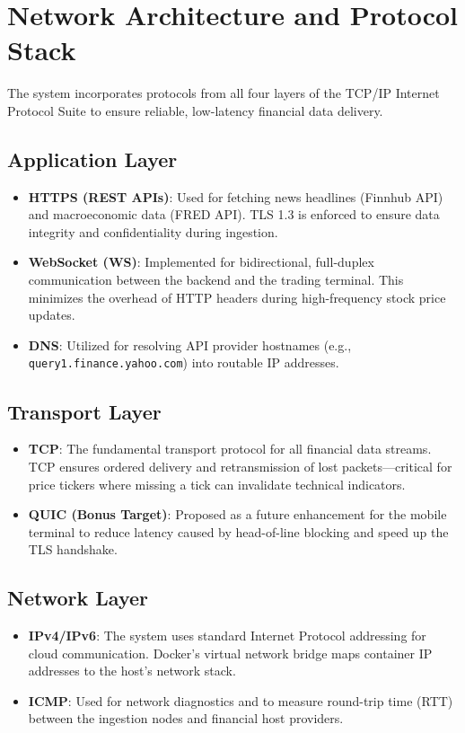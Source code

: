 \section{Network Architecture and Protocol Stack}

The system incorporates protocols from all four layers of the TCP/IP Internet Protocol Suite to ensure reliable, low-latency financial data delivery.

\subsection{Application Layer}
\begin{itemize}
    \item \textbf{HTTPS (REST APIs)}: Used for fetching news headlines (Finnhub API) and macroeconomic data (FRED API). TLS 1.3 is enforced to ensure data integrity and confidentiality during ingestion.
    \item \textbf{WebSocket (WS)}: Implemented for bidirectional, full-duplex communication between the backend and the trading terminal. This minimizes the overhead of HTTP headers during high-frequency stock price updates.
    \item \textbf{DNS}: Utilized for resolving API provider hostnames (e.g., \texttt{query1.finance.yahoo.com}) into routable IP addresses.
\end{itemize}

\subsection{Transport Layer}
\begin{itemize}
    \item \textbf{TCP}: The fundamental transport protocol for all financial data streams. TCP ensures ordered delivery and retransmission of lost packets—critical for price tickers where missing a tick can invalidate technical indicators.
    \item \textbf{QUIC (Bonus Target)}: Proposed as a future enhancement for the mobile terminal to reduce latency caused by head-of-line blocking and speed up the TLS handshake.
\end{itemize}

\subsection{Network Layer}
\begin{itemize}
    \item \textbf{IPv4/IPv6}: The system uses standard Internet Protocol addressing for cloud communication. Docker's virtual network bridge maps container IP addresses to the host's network stack.
    \item \textbf{ICMP}: Used for network diagnostics and to measure round-trip time (RTT) between the ingestion nodes and financial host providers.
\end{itemize}

